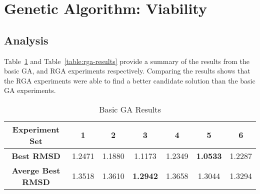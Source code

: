 \section{Genetic Algorithm: Viability}

\subsection{Analysis}

Table~\ref{table:basic-ga-results} and Table~\ref{table:rga-results} provide a summary of the results from the basic GA, and RGA experiments respectively. Comparing the results shows that the RGA experiments were able to find a better candidate solution than the basic GA experiments. 

\begin{table}
	\centering
	\begin{tabular}{ | >{\bfseries}c | c | c | c | c | c | c | }
		\hline
		Experiment Set & 1 & 2 & 3 & 4 & 5 & 6 \\ \hline
		Best RMSD & 1.2471 & 1.1880 & 1.1173 & 1.2349 & \textbf{1.0533} & 1.2287 \\ \hline
		Averge Best RMSD & 1.3518 & 1.3610 & \textbf{1.2942} & 1.3658 & 1.3044 & 1.3294 \\ \hline
	\end{tabular}
	\caption{Basic GA Results}
	\label{table:basic-ga-results}
\end{table}

